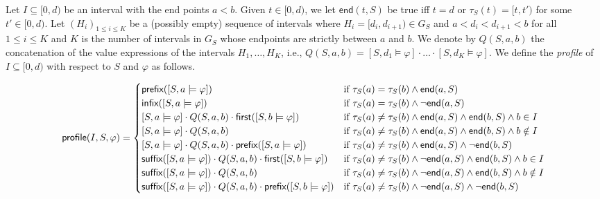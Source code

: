 Let $I \subseteq [0,d)$ be an interval with the end points $a < b$.
Given $t \in [0,d)$, we let $\mathsf{end}(t, S)$ be true iff $t=d$ or $\tau_S(t) = [t, t')$ for some $t' \in [0,d)$.
Let $(H_i)_{1 \leq i \leq K}$ be a (possibly empty) sequence of intervals where $H_i = [d_i, d_{i+1}) \in G_S$ and $a < d_i < d_{i+1} < b$ for all $1 \leq i \leq K$ and $K$ is the number of intervals in $G_S$ whose endpoints are strictly between $a$ and $b$.
We denote by $Q(S, a, b)$ the concatenation of the value expressions of the intervals $H_1, \ldots, H_K$, i.e., $Q(S, a, b) = [S, d_1 \models \varphi] \cdot \ldots \cdot [S, d_K \models \varphi]$.
We define the \emph{profile} of $I \subseteq [0,d)$ with respect to $S$ and $\varphi$ as follows.

\scriptsize
	\begin{equation*} 
		\mathsf{profile}(I, S, \varphi) =
		\begin{cases}
			\textsf{prefix}([S, a \models \varphi]) &\text{if $\tau_S(a) = \tau_S(b) \land \mathsf{end}(a, S)$} \\
			\textsf{infix}([S, a \models \varphi]) &\text{if $\tau_S(a) = \tau_S(b) \land \lnot\mathsf{end}(a, S)$} \\
			[S, a \models \varphi] \cdot Q(S, a, b) \cdot \textsf{first}([S, b \models \varphi]) &\text{if $\tau_S(a) \neq \tau_S(b) \land \mathsf{end}(a, S) \land \mathsf{end}(b, S) \land b \in I$} \\
			[S, a \models \varphi] \cdot Q(S, a, b) &\text{if $\tau_S(a) \neq \tau_S(b) \land \mathsf{end}(a, S) \land \mathsf{end}(b, S) \land b \notin I$} \\
			[S, a \models \varphi] \cdot Q(S, a, b) \cdot \textsf{prefix}([S, a \models \varphi]) &\text{if $\tau_S(a) \neq \tau_S(b) \land \mathsf{end}(a, S) \land \lnot\mathsf{end}(b, S)$} \\
			\textsf{suffix}([S, a \models \varphi]) \cdot Q(S, a, b) \cdot \textsf{first}([S, b \models \varphi]) &\text{if $\tau_S(a) \neq \tau_S(b) \land \lnot\mathsf{end}(a, S) \land \mathsf{end}(b, S) \land b \in I$} \\
			\textsf{suffix}([S, a \models \varphi]) \cdot Q(S, a, b) &\text{if $\tau_S(a) \neq \tau_S(b) \land \lnot\mathsf{end}(a, S) \land \mathsf{end}(b, S) \land b \notin I$} \\
			\textsf{suffix}([S, a \models \varphi]) \cdot Q(S, a, b) \cdot \textsf{prefix}([S, b \models \varphi]) &\text{if $\tau_S(a) \neq \tau_S(b) \land \lnot\mathsf{end}(a, S) \land \lnot\mathsf{end}(b, S)$} 
		\end{cases}
	\end{equation*}
\normalsize

